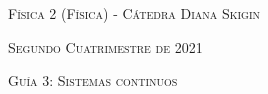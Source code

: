 \documentclass[11pt,spanish]{article}
\begin{document}
    \begin{center}
    \textsc{\large Física 2 (Física) - Cátedra Diana Skigin}
    \par\end{center}{\large \par}
    
    \begin{center}
    \textsc{\large Segundo Cuatrimestre de 2021}
    \par\end{center}{\large \par}
    
    \begin{center}
    \textsc{\large Guía 3: Sistemas continuos}
    \par\end{center}{\large \par}
\end{document}
